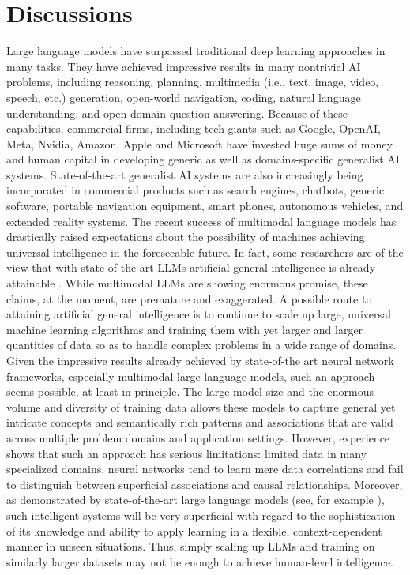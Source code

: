 \documentclass[10pt,journal,compsoc]{IEEEtran}
\begin{document}
	
	\section{Discussions}
	Large language models have surpassed traditional deep learning approaches in many tasks. They have achieved impressive results in many nontrivial AI problems, including reasoning, planning, multimedia (i.e., text, image, video, speech, etc.) generation, open-world navigation, coding, natural language understanding, and open-domain question answering. Because of these capabilities, commercial firms, including tech giants such as Google, OpenAI, Meta, Nvidia, Amazon, Apple and Microsoft have invested huge sums of money and human capital in developing generic as well as domains-specific generalist AI systems. State-of-the-art generalist AI systems are also increasingly being incorporated in commercial products such as search engines, chatbots, generic software, portable navigation equipment, smart phones, autonomous vehicles, and extended reality systems.
	The recent success of multimodal language models has drastically raised expectations about the possibility of machines achieving universal intelligence in the foreseeable future. In fact, some researchers are of the view that with state-of-the-art LLMs artificial general intelligence is already attainable \cite{y2023artificial,li2024artificial,ilic2024evidence}. While multimodal LLMs are showing enormous promise, these claims, at the moment, are premature and exaggerated. 
	A possible route to attaining artificial general intelligence is to continue to scale up large, universal machine learning algorithms and training them with yet larger and larger quantities of data so as to handle complex problems in a wide range of domains. Given the impressive results already achieved by state-of-the art neural network frameworks, especially multimodal large language models, such an approach seems possible, at least in principle. The large model size and the enormous volume and diversity of training data allows these models to capture general yet intricate concepts and semantically rich patterns and associations that are valid across multiple problem domains and application settings. However, experience shows that such an approach has serious limitations: limited data in many specialized domains, neural networks tend to learn mere data correlations and fail to distinguish between superficial associations and causal relationships.  Moreover, as demonstrated by state-of-the-art large language models (see, for example \cite{bender2021dangers,zevcevic2023causal,ray2023chatgpt,huang2023survey}), such intelligent systems will be very superficial with regard to the sophistication of its knowledge and ability to apply learning in a flexible, context-dependent manner in unseen situations. Thus, simply scaling up LLMs and training on similarly larger datasets may not be enough to achieve human-level intelligence. 
	
\end{document}
